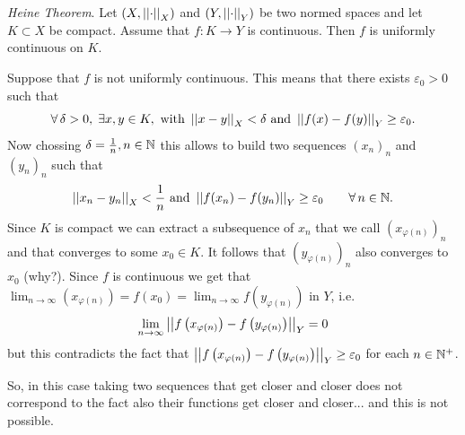 \documentclass{article}
\begin{document}
\begin{theorem}
	\emph{Heine Theorem}. Let $(X,\left|\left|\cdot\right|\right|_X)$ and $(Y,\left|\left|\cdot\right|\right|_Y)$ be two normed spaces and let $K\subset X$ be compact. Assume that $f:K\to Y$ is continuous. Then $f$ is uniformly continuous on $K$.
\end{theorem}
\begin{fancyproof}
	Suppose that $f$ is not uniformly continuous. This means that there exists $\varepsilon_0>0$  such that
	\begin{equation*}
		\forall\,\delta>0,\;\exists x,y\in K,\text{ with }\left|\left|x-y\right|\right|_{X}<\delta\text{ and }\left|\left|f(x)-f(y)\right|\right|_{Y}\geq\varepsilon_0	.
		\end{equation*}
		Now chossing $\delta=\frac{1}{n},n\in\mathbb{N}$ this allows to build two sequences ${(x_{n})}_{n}$ and ${(y_{n})}_{n}$ such that
		\begin{equation*}
			\left|\left|x_{n}-y_n\right|\right|_{X}<\frac{1}{n}\text{ and }\left|\left|f(x_{n})-f(y_{n})\right|\right|_{Y}\geq\varepsilon_0\qquad\forall\, n\in\mathbb{N}.
		\end{equation*}
		Since $K$ is compact we can extract a subsequence of $x_n$ that we call ${\left(x_{\varphi(n)}\right)}_{n}$ and that converges to some $x_0\in K$. It follows that ${\left(y_{\varphi(n)}\right)}_{n}$ also converges to $x_0$ (why?). Since $f$ is continuous we get that $\lim_{n\to\infty}{\left(x_{\varphi(n)}\right)}=f(x_0)=\lim_{n\to\infty}f\left(y_{\varphi(n)}\right)$ in $Y$, i.e.
		\begin{equation*}
			\lim_{n \to \infty}\left|\left|f\left(x_{\varphi(n)}\right)-f\left(y_{\varphi(n)}\right)\right|\right|_{Y}=0
		\end{equation*}
		but this contradicts the fact that $\left|\left|f\left(x_{\varphi(n)}\right)-f\left(y_{\varphi(n)}\right)\right|\right|_{Y}\geq\varepsilon_0$ for each $n\in\mathbb{N}^{+}$. 
\end{fancyproof}
So, in this case taking two sequences that get closer and closer does not correspond to the fact also their functions get closer and closer... and this is not possible.
\end{document}
